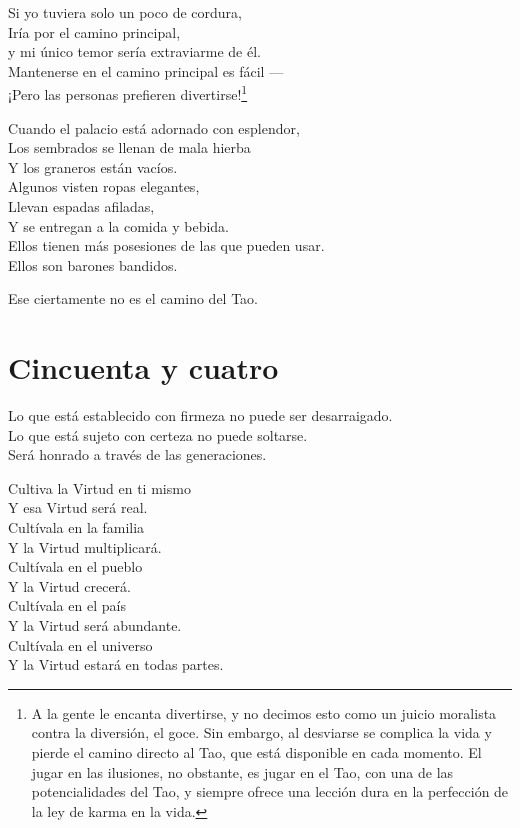 \documentclass[hidelinks]{memoir}
\begin{document}
	Si yo tuviera solo un poco de cordura,\\
	Iría por el camino principal,\\
	y mi único temor sería extraviarme de él.\\
	Mantenerse en el camino principal es fácil ---\\
	¡Pero las personas prefieren divertirse!\footnote{A la gente le encanta divertirse, y no decimos esto como un juicio
		moralista contra la diversión, el goce. Sin embargo, al desviarse se
		complica la vida y pierde el camino directo al Tao, que está disponible
		en cada momento. El jugar en las ilusiones, no obstante, es jugar en el
		Tao, con una de las potencialidades del Tao, y siempre ofrece una
		lección dura en la perfección de la ley de karma en la vida.}
	
	Cuando el palacio está adornado con esplendor,\\
	Los sembrados se llenan de mala hierba\\
	Y los graneros están vacíos.\\
	Algunos visten ropas elegantes,\\
	Llevan espadas afiladas,\\
	Y se entregan a la comida y bebida.\\
	Ellos tienen más posesiones de las que pueden usar.\\
	Ellos son barones bandidos.
	
	Ese ciertamente no es el camino del Tao.
	
	\chapter*{Cincuenta y cuatro}
	
	Lo que está establecido con firmeza no puede ser desarraigado.\\
	Lo que está sujeto con certeza no puede soltarse.\\
	Será honrado a través de las generaciones.
	
	Cultiva la Virtud en ti mismo\\
	Y esa Virtud será real.\\
	Cultívala en la familia\\
	Y la Virtud multiplicará.\\
	Cultívala en el pueblo\\
	Y la Virtud crecerá.\\
	Cultívala en el país\\
	Y la Virtud será abundante.\\
	Cultívala en el universo\\
	Y la Virtud estará en todas partes.
	
\end{document}
